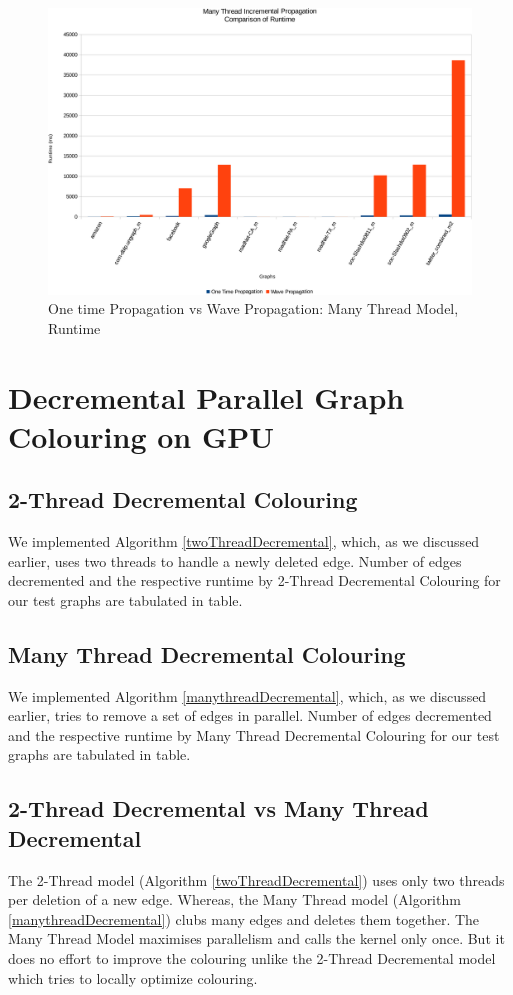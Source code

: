 \documentclass[MTech]{iitmdiss}
\begin{document}
\begin{figure}[h]
    \centering
    \includegraphics[width=\textwidth,keepaspectratio=true]{chartNewest35.pdf}
    \caption{
        One time Propagation vs Wave Propagation: Many Thread Model, Runtime
    }
    \label{fig:chart20}
\end{figure}

\section{Decremental Parallel Graph Colouring on GPU}
\subsection{2-Thread Decremental Colouring}
We implemented Algorithm \ref{twoThreadDecremental}, which, as we discussed earlier, uses two threads to handle a newly deleted edge. Number of edges decremented and the respective runtime by 2-Thread Decremental Colouring for our test graphs are tabulated in table.

\subsection{Many Thread Decremental Colouring}
We implemented Algorithm \ref{manythreadDecremental}, which, as we discussed earlier, tries to remove a set of edges in parallel. Number of edges decremented and the respective runtime by Many Thread Decremental Colouring for our test graphs are tabulated in table.

\subsection{2-Thread Decremental vs Many Thread Decremental}
The 2-Thread model (Algorithm \ref{twoThreadDecremental}) uses only two threads per deletion of a new edge. Whereas, the Many Thread model (Algorithm \ref{manythreadDecremental}) clubs many edges and deletes them together. The Many Thread Model maximises parallelism and calls the kernel only once. But it does no effort to improve the colouring unlike the 2-Thread Decremental model which tries to locally optimize colouring.
\end{document}
